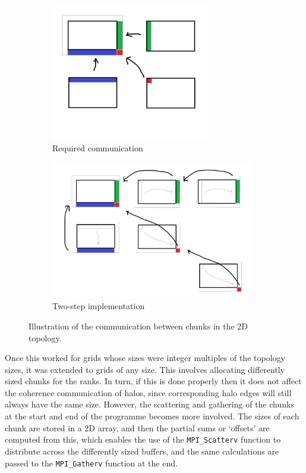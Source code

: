 \documentclass[12pt]{article}
\begin{document}
\begin{figure}[hp]
    \begin{subfigure}{0.49\textwidth}
    \includegraphics[width=0.9\linewidth, height=6cm, center]{figures/domain_decomp_2d_1.png}
    \caption{Required communication}
    \label{fig:domain_2d_1}
    \end{subfigure}
    \begin{subfigure}{0.49\textwidth}
    \includegraphics[width=0.9\linewidth, height=6cm, center]{figures/domain_decomp_2d_2.png}
    \caption{Two-step implementation}
    \label{fig:domain_2d_2}
    \end{subfigure}

    \caption{Illustration of the communication between chunks in the 2D topology.}
    \label{fig:domain_2d}
\end{figure}

Once this worked for grids whose sizes were integer multiples of the topology sizes, it was extended to grids of any size.
This involves allocating differently sized chunks for the ranks.
In turn, if this is done properly then it does not affect the coherence communication of halos,
since corresponding halo edges will still always have the same size.
However, the scattering and gathering of the chunks at the start and end of the programme becomes more involved.
The sizes of each chunk are stored in a 2D array, and then the partial sums or `offsets' are computed from this,
which enables the use of the \texttt{MPI\_Scatterv} function to distribute across the differently sized buffers,
and the same calculations are passed to the \texttt{MPI\_Gatherv} function at the end.
\end{document}
